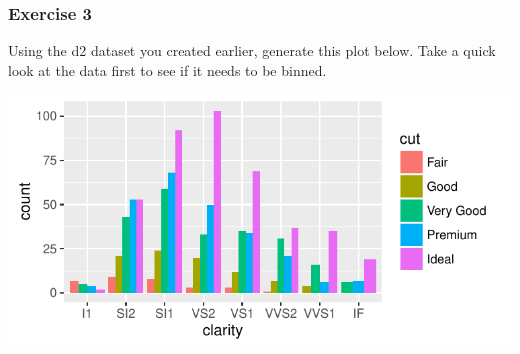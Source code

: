 \documentclass{beamer}\usepackage[]{graphicx}\usepackage[]{color}
\makeatletter
\def\maxwidth{ %
  \ifdim\Gin@nat@width>\linewidth
    \linewidth
  \else
    \Gin@nat@width
  \fi
}
\newenvironment{knitrout}{}{} %
\makeatother
\begin{document}
\begin{frame}[fragile]
\frametitle{Exercise 3}
Using the d2 dataset you created earlier, generate this plot below. Take a quick look at the data first to see if it needs to be binned.
\begin{knitrout}\footnotesize
{}\color{fgcolor}

{\centering \includegraphics[width=\maxwidth]{figure/ex3-1} 

}



\end{knitrout}
\end{frame}

\end{document}
